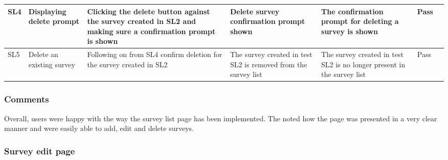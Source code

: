 \begin{longtable}{|p{}|p{}|p{}|p{}|p{}|p{}|p{}|}
  \hline
  SL4 & Displaying delete prompt                        & Clicking the delete button against the survey created in SL2 and making sure a confirmation prompt is shown                                                           & Delete survey confirmation prompt shown                                     & The confirmation prompt for deleting a survey is shown                                                                              & Pass           &          \\ 
  \hline
  SL5 & Delete an existing survey                       & Following on from SL4 confirm deletion for the survey created in SL2                                                                                                  & The survey created in test SL2 is removed from the survey list              & The survey created in test SL2 is no longer present in the survey list                                                              & Pass           &          \\
  \hline
\end{longtable}

\subsubsection*{Comments}
Overall, users were happy with the way the survey list page has been implemented.
The noted how the page was presented in a very clear manner and were easily able to add, edit and delete surveys. 
  
\subsubsection{Survey edit page}


